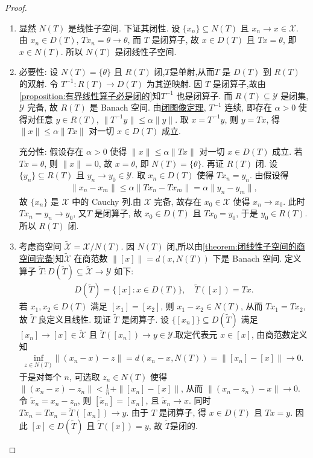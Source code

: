 \documentclass[../../main.tex]{subfiles}%
\begin{document}
\begin{proof}
\begin{enumerate}[(1)]
\item 显然 $N(T)$ 是线性子空间. 下证其闭性. 设 $\{x_n\}\subseteq N(T)$ 且 $x_n\to x\in\mathscr{X}$. 由 $x_n\in D(T)$, $Tx_n=\theta \to\theta$, 而 $T$ 是闭算子, 故 $x\in D(T)$ 且 $Tx=\theta$, 即 $x\in N(T)$. 所以 $N(T)$ 是闭线性子空间.

\item {\heiti 必要性:} 设 $N(T)=\{\theta\}$ 且 $R(T)$ 闭,$T$是单射,从而$T$ 是 $D(T)$ 到 $R(T)$ 的双射. 令 $T^{-1}:R(T)\to D(T)$ 为其逆映射. 因 $T$ 是闭算子,故由\cref{proposition:有界线性算子必是闭的}知$T^{-1}$ 也是闭算子. 而 $R(T)\subseteq\mathscr{Y}$ 是闭集, $\mathscr{Y}$ 完备, 故 $R(T)$ 是 Banach 空间. 由\hyperref[theorem:泛函分析--闭图像定理]{闭图像定理}, $T^{-1}$ 连续, 即存在 $\alpha>0$ 使得对任意 $y\in R(T)$, $\|T^{-1}y\|\leqslant\alpha\|y\|$. 取 $x=T^{-1}y$, 则 $y=Tx$, 得 $\|x\|\leqslant\alpha\|Tx\|$ 对一切 $x\in D(T)$ 成立.

{\heiti 充分性:} 假设存在 $\alpha>0$ 使得 $\|x\|\leqslant\alpha\|Tx\|$ 对一切 $x\in D(T)$ 成立. 若 $Tx=\theta$, 则 $\|x\|=0$, 故 $x=\theta$, 即 $N(T)=\{\theta\}$. 再证 $R(T)$ 闭. 设 $\{y_n\}\subseteq R(T)$ 且 $y_n\to y_0\in\mathscr{Y}$. 取 $x_n\in D(T)$ 使得 $Tx_n=y_n$. 由假设得
\begin{align*}
\|x_n-x_m\|\leqslant\alpha\|Tx_n-Tx_m\|=\alpha\|y_n-y_m\|,
\end{align*}
故 $\{x_n\}$ 是 $\mathscr{X}$ 中的 Cauchy 列.由 $\mathscr{X}$ 完备, 故存在 $x_0\in\mathscr{X}$ 使得 $x_n\to x_0$. 此时 $Tx_n=y_n\to y_0$, 又$T$ 是闭算子, 故 $x_0\in D(T)$ 且 $Tx_0=y_0$, 于是 $y_0\in R(T)$. 所以 $R(T)$ 闭.

\item 考虑商空间 $\widetilde{\mathscr{X}}=\mathscr{X}/N(T)$. 因 $N(T)$ 闭,所以由\cref{theorem:闭线性子空间的商空间完备}知$\widetilde{\mathscr{X}}$ 在商范数 $\|[x]\|=d(x,N(T))$ 下是 Banach 空间. 定义算子 $\widetilde{T}:D(\widetilde{T})\subseteq\widetilde{\mathscr{X}}\to\mathscr{Y}$ 如下:
\begin{align*}
D(\widetilde{T})=\{[x]: x\in D(T)\},\quad \widetilde{T}([x])=Tx.
\end{align*}
若 $x_1,x_2\in D(T)$ 满足 $[x_1]=[x_2]$, 则 $x_1-x_2\in N(T)$, 从而 $Tx_1=Tx_2$, 故 $\widetilde{T}$ 良定义且线性. 现证 $\widetilde{T}$ 是闭算子. 设 $\{[x_n]\}\subseteq D(\widetilde{T})$ 满足 $[x_n]\to [x]\in\widetilde{\mathscr{X}}$ 且 $\widetilde{T}([x_n])\to y\in\mathscr{Y}$.取定代表元 $x\in [x]$, 由商范数定义知
\begin{align*}
\underset{z\in N\left( T \right)}{\mathrm{inf}}\left\| \left( x_n-x \right) -z \right\| =d(x_n-x,N(T))=\|[x_n]-[x]\|\to0.
\end{align*}
于是对每个 $n$, 可选取 $z_n\in N(T)$ 使得 $\|(x_n-x)-z_n\|<\frac{1}{n}+\|[x_n]-[x]\|$, 从而 $\|(x_n-z_n)-x\|\to0$. 令 $\widetilde{x}_n=x_n-z_n$, 则 $[\widetilde{x}_n]=[x_n]$, 且 $\widetilde{x}_n\to x$. 同时 $T\widetilde{x}_n=Tx_n=\widetilde{T}([x_n])\to y$. 由于 $T$ 是闭算子, 得 $x\in D(T)$ 且 $Tx=y$.  因此 $[x]\in D(\widetilde{T})$ 且 $\widetilde{T}([x])=y$, 故 $\widetilde{T}$是闭的. 


\end{enumerate}
\end{proof}
\end{document}
